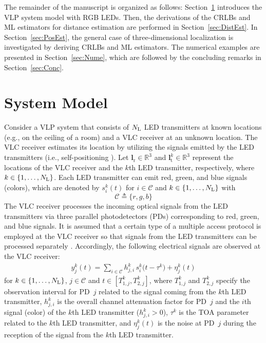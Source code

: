 \documentclass[10pt,twocolumn]{IEEEtran}
\newcommand{\NL}{N_{\rm{L}}}
\newcommand{\mtC}{{\mathcal{C}}}
\newcommand{\lr}{{\boldsymbol{l}_{\mathrm{r}}}}
\newcommand{\lt}[1]{{\boldsymbol{l}^{#1}_{\mathrm{t}}}}
\begin{document}
The remainder of the manuscript is organized as follows: Section~\ref{sec:Model} introduces the VLP system model with RGB LEDs. Then, the derivations of the CRLBs and ML estimators for distance estimation are performed in Section~\ref{sec:DistEst}. In Section~\ref{sec:PosEst}, the general case of three-dimensional localization is investigated by deriving CRLBs and ML estimators. The numerical examples are presented in Section~\ref{sec:Nume}, which are followed by the concluding remarks in Section~\ref{sec:Conc}.


\section{System Model}\label{sec:Model}

Consider a VLP system that consists of $\NL$ LED transmitters at known locations (e.g., on the ceiling of a room) and a VLC receiver at an unknown location. The VLC receiver estimates its location by utilizing the signals emitted by the LED transmitters (i.e., self-positioning  \cite{Sinan_Survey}). Let $\lr\in\mathbb{R}^3$ and $\lt{k}\in\mathbb{R}^3$ represent the locations of the VLC receiver and the $k$th LED transmitter, respectively, where $k\in\{1,\ldots,\NL\}$. Each LED transmitter can emit red, green, and blue signals (colors), which are denoted by $s^k_i(t)$ for $i\in\mtC$ and $k\in\{1,\ldots,\NL\}$ with
\begin{equation}\label{eq:Cset}
\mtC\triangleq\{r,g,b\}
\end{equation}
The VLC receiver processes the incoming optical signals from the LED transmitters via three parallel photodetectors (PDs) corresponding to red, green, and blue signals. It is assumed that a certain type of a multiple access protocol is employed at the VLC receiver so that signals from the LED transmitters can be processed separately \cite{Direct_TCOM,VLC_Survey}. Accordingly, the following electrical signals are observed at the VLC receiver:
\begin{gather}\label{eq:RecSig}
y^k_j(t)=\sum_{i\in\mtC}h^k_{j,i}\,s^k_i\big(t-\tau^k\big)+\eta^k_j(t)
\end{gather}
for $k\in\{1,\ldots,\NL\}$, $j\in\mtC$ and $t\in[T^k_{1,j},T^k_{2,j}]$, where $T^k_{1,j}$ and $T^k_{2,j}$ specify the observation interval for PD~$j$ related to the signal coming from the $k$th LED transmitter, $h^k_{j,i}$ is the overall channel attenuation factor for PD~$j$ and the $i$th signal (color) of the $k$th LED transmitter ($h^k_{j,i}>0$),
$\tau^k$ is the TOA parameter related to the $k$th LED transmitter, and $\eta^k_j(t)$ is the noise at PD~$j$ during the reception of the signal from the $k$th LED transmitter.
\end{document}
